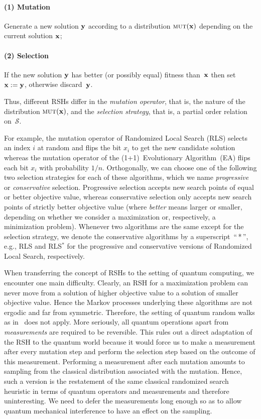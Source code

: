 \documentclass[a4paper,11pt]{article}
\begin{document}
\paragraph{(1) Mutation} Generate a new solution $\yvec$ according to a distribution $\mut(\xvec)$ depending on the current solution $\xvec$;

\paragraph{(2) Selection} If the new solution $\yvec$ has better (or possibly equal) fitness than~$\xvec$ then set~$\xvec:= \yvec$, otherwise discard~$\yvec$.

Thus, different RSHs differ in the \emph{mutation operator}, that is, the nature of the distribution $\mut(\xvec)$, and the \emph{selection strategy}, that is, a partial order relation on~$\mathcal{S}$.

For example, the mutation operator of Randomized Local Search (RLS) selects an index $i$ at random and flips the bit $x_i$ to get the new candidate solution whereas the mutation operator of the (1+1)~Evolutionary Algorithm~(EA) flips each bit $x_i$ with probability $1/n$. Orthogonally, we can choose one of the following two selection strategies for each of these algorithms, which we name \emph{progressive} or \emph{conservative} selection. Progressive selection accepts new search points of equal or better objective value, whereas conservative selection only accepts new search points of strictly better objective value (where \emph{better} means larger or smaller, depending on whether we consider a maximization or, respectively, a minimization problem). Whenever two algorithms are the same except for the selection strategy, we denote the conservative algorithms by a superscript~``\,*\,'', e.g., RLS and RLS$^*$ for the progressive and conservative versions of Randomized Local Search, respectively.

When transferring the concept of RSHs to the setting of quantum
computing, we encounter one main difficulty. Clearly, an RSH for a
maximization problem can never move from a solution of higher
objective value to a solution of smaller objective value. Hence the
Markov processes underlying these algorithms are not ergodic and far
from symmetric. Therefore, the setting of quantum random walks as
in~\cite{Szegedy04,MagniezNRS11,MagniezNRS12} does not apply. More
seriously, all quantum operations apart from \emph{measurements} are
required to be reversible. This rules out a direct adaptation of the
RSH to the quantum world because it would force us to make a
measurement after every mutation step and perform the selection step
based on the outcome of this measurement. Performing a measurement after
each mutation amounts to sampling from the classical distribution
associated with the mutation. Hence, such a version is the restatement
of the same classical randomized search heuristic in terms of quantum
operators and measurements and therefore uninteresting. We need to
defer the measurements long enough so as to allow quantum mechanical
interference to have an effect on the sampling.
\end{document}
